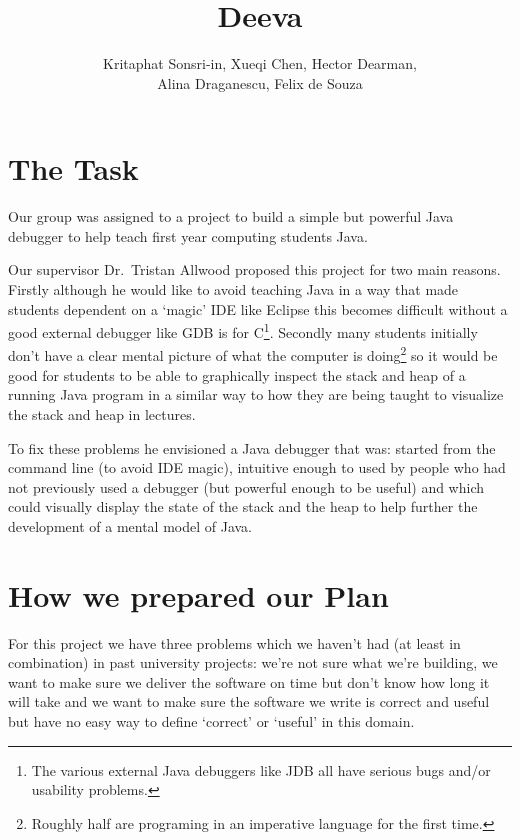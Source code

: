 \documentclass[11pt, a4paper]{article}
\newcommand{\subtitle}[1]{
  \posttitle{
    \par\end{center}
    \begin{center}\large#1\end{center}
    \vskip0.5em}
}
\begin{document}
\title{Deeva}
\subtitle{Planning Report}
\author{Kritaphat Sonsri-in, Xueqi Chen, Hector Dearman, \\Alina Draganescu, Felix de Souza}

\maketitle

\section{The Task}
Our group was assigned to a project to build a simple but powerful Java debugger to help teach first year computing students Java.

Our supervisor Dr.~Tristan Allwood proposed this project for two main reasons.
Firstly although he would like to avoid teaching Java in a way that made students dependent on a `magic' IDE like Eclipse this becomes difficult without a good external debugger like GDB is for C\footnote{The various external Java debuggers like JDB all have serious bugs and/or usability problems.}.
Secondly many students initially don't have a clear mental picture of what the computer is doing\footnote{Roughly half are programing in an imperative language for the first time.} so it would be good for students to be able to graphically inspect the stack and heap of a running Java program in a similar way to how they are being taught to visualize the stack and heap in lectures.

To fix these problems he envisioned a Java debugger that was: started from the command line (to avoid IDE magic), intuitive enough to used by people who had not previously used a debugger (but powerful enough to be useful) and which could visually display the state of the stack and the heap to help further the development of a mental model of Java.

\section{How we prepared our Plan}

For this project we have three problems which we haven't had (at least in combination) in past university projects: we're not sure what we're building, we want to make sure we deliver the software on time but don't know how long it will take and
we want to make sure the software we write is correct and useful but have no easy way to define `correct' or `useful' in this domain.
\end{document}

